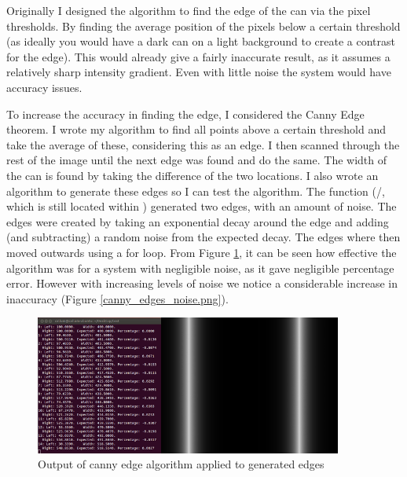 Originally I designed the algorithm to find the edge of the can via the pixel thresholds.  By finding the average position of the pixels below a certain threshold (as ideally you would have a dark can on a light background to create a contrast for the edge). This would already give a fairly inaccurate result, as it assumes a relatively sharp intensity gradient.  Even with little noise the system would have accuracy issues.

To increase the accuracy in finding the edge, I considered the Canny Edge theorem.  I wrote my algorithm to find all points above a certain threshold and take the average of these, considering this as an edge.  I then scanned through the rest of the image until the next edge was found and do the same.  The width of the can is found by taking the difference of the two locations.  I also wrote an algorithm to generate these edges so I can test the algorithm.  The function (/, which is still located within ) generated two edges, with an amount of noise.  The edges were created by taking an exponential decay around the edge and adding (and subtracting) a random noise from the expected decay.  The edges where then moved outwards using a for loop. From Figure \ref{canny_edges.png}, it can be seen how effective the algorithm was for a system with negligible noise, as it gave negligible percentage error.  However with increasing levels of noise we notice a considerable increase in inaccuracy (Figure \ref{canny_edges_noise.png}).  



\begin{figure}[H]
	\centering
	\includegraphics[width=0.9\textwidth]{figures/canny_edges.png}
	\caption{Output of canny edge algorithm applied to generated edges} 
	\label{canny_edges.png}
\end{figure}

